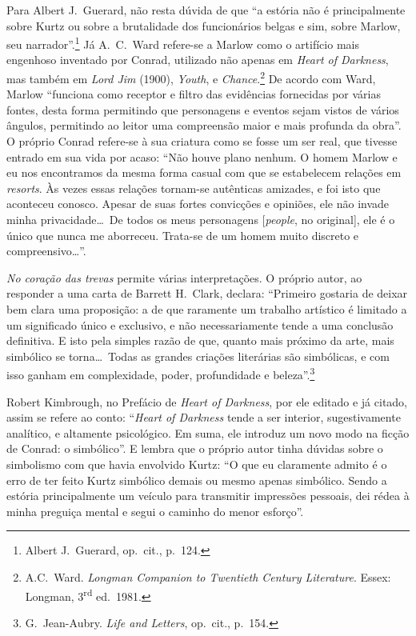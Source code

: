 Para Albert J.~Guerard, não resta dúvida de que ``a estória não
é principalmente sobre Kurtz ou sobre a brutalidade dos funcionários
belgas e sim, sobre Marlow, seu narrador''.\footnote{ Albert J.~Guerard, op.~cit., p.~124.}
Já A.~C.~Ward refere{}-se a Marlow como o artifício mais
engenhoso inventado por Conrad, utilizado não apenas em \textit{Heart of Darkness}, 
mas também em \textit{Lord Jim} (1900), \textit{Youth}, e \textit{Chance}.\footnote{ A.C.~Ward.
\textit{Longman Companion to Twentieth Century Literature}. Essex: Longman, 3\textsuperscript{rd} ed.~1981.}
De acordo com Ward,  Marlow ``funciona como receptor e filtro
das evidências fornecidas por várias fontes, desta forma permitindo que
personagens e eventos sejam vistos de vários ângulos, permitindo ao leitor uma compreensão
maior e mais profunda da obra''.  O próprio Conrad refere{}-se à sua
criatura como se fosse um ser real, que tivesse entrado em sua vida por
acaso: ``Não houve plano nenhum. O homem Marlow e eu nos encontramos da
mesma forma casual com que se estabelecem relações em 
\textit{resorts}. Às vezes essas relações tornam{}-se autênticas
amizades, e foi isto que aconteceu conosco. Apesar de suas fortes
convicções e opiniões, ele não invade minha privacidade\ldots\ De todos os
meus personagens [\textit{people}, no original], ele é o único que
nunca me aborreceu. Trata{}-se de um homem muito discreto e compreensivo\ldots''.

\textit{No coração das trevas} permite várias
interpretações. O próprio autor, ao responder a uma carta de Barrett H.~Clark, 
declara: ``Primeiro gostaria de deixar bem clara uma proposição:
a de que raramente um trabalho artístico é limitado a um significado
único e exclusivo, e não necessariamente tende a uma conclusão
definitiva. E isto pela simples razão de que, quanto mais próximo da
arte, mais simbólico se torna\ldots\ Todas as grandes criações
literárias são simbólicas, e com isso ganham em complexidade, poder,
profundidade e beleza''.\footnote{ G.~Jean{}-Aubry. \textit{Life and Letters}, op.~cit., p.~154.}

Robert Kimbrough, no Prefácio de \textit{Heart of Darkness}, por ele
editado e já citado, assim se refere ao conto: ``\textit{Heart of
Darkness} tende a ser interior, sugestivamente analítico, e altamente
psicológico. Em suma, ele introduz um novo modo na ficção de Conrad: o
simbólico''. E lembra que o próprio autor tinha dúvidas sobre o
simbolismo com que havia envolvido Kurtz: ``O que eu claramente admito é
o erro de ter feito Kurtz simbólico demais ou mesmo apenas simbólico.
Sendo a estória principalmente um veículo para transmitir impressões
pessoais, dei rédea à minha preguiça mental e segui o caminho do menor esforço''.

